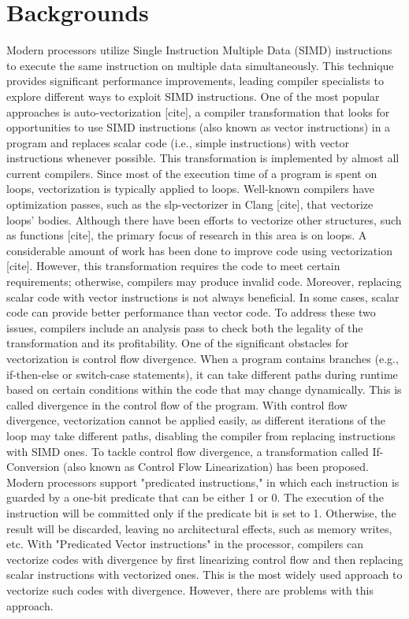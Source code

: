 \documentclass[\main/thesis.tex]{subfiles}
\begin{document}
\chapter{Backgrounds}

Modern processors utilize Single Instruction Multiple Data (SIMD) instructions to execute the same instruction on multiple data simultaneously. This technique provides significant performance improvements, leading compiler specialists to explore different ways to exploit SIMD instructions. One of the most popular approaches is auto-vectorization [cite], a compiler transformation that looks for opportunities to use SIMD instructions (also known as vector instructions) in a program and replaces scalar code (i.e., simple instructions) with vector instructions whenever possible. This transformation is implemented by almost all current compilers.
Since most of the execution time of a program is spent on loops, vectorization is typically applied to loops. Well-known compilers have optimization passes, such as the slp-vectorizer in Clang [cite], that vectorize loops' bodies. Although there have been efforts to vectorize other structures, such as functions [cite], the primary focus of research in this area is on loops.
A considerable amount of work has been done to improve code using vectorization [cite]. However, this transformation requires the code to meet certain requirements; otherwise, compilers may produce invalid code. Moreover, replacing scalar code with vector instructions is not always beneficial. In some cases, scalar code can provide better performance than vector code. To address these two issues, compilers include an analysis pass to check both the legality of the transformation and its profitability.
One of the significant obstacles for vectorization is control flow divergence. When a program contains branches (e.g., if-then-else or switch-case statements), it can take different paths during runtime based on certain conditions within the code that may change dynamically. This is called divergence in the control flow of the program. With control flow divergence, vectorization cannot be applied easily, as different iterations of the loop may take different paths, disabling the compiler from replacing instructions with SIMD ones.
To tackle control flow divergence, a transformation called If-Conversion (also known as Control Flow Linearization) has been proposed. Modern processors support "predicated instructions," in which each instruction is guarded by a one-bit predicate that can be either 1 or 0. The execution of the instruction will be committed only if the predicate bit is set to 1. Otherwise, the result will be discarded, leaving no architectural effects, such as memory writes, etc. With "Predicated Vector instructions" in the processor,
compilers can vectorize codes with divergence by first linearizing control flow and then replacing scalar instructions with vectorized ones. 
This is the most widely used approach to vectorize such codes with divergence. However, there are problems with this approach.
\end{document}
